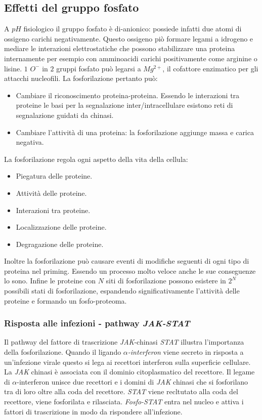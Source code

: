 	\subsection{Effetti del gruppo fosfato}
	A $pH$ fisiologico il gruppo fosfato \`e di-anionico: possiede infatti due atomi di ossigeno carichi negativamente. 
	Questo ossigeno pi\`o formare legami a idrogeno e mediare le interazioni elettrostatiche che possono stabilizzare una proteina internamente per esempio con amminoacidi carichi positivamente come arginine o lisine.
	$1$ \emph{$O^-$} in $2$ gruppi fosfato pu\`o legarsi a \emph{$Mg^{2+}$}, il cofattore enzimatico per gli attacchi nucleofili. 
	La fosforilazione pertanto pu\`o:
	\begin{itemize}
		\item Cambiare il riconoscimento proteina-proteina. 
			Essendo le interazioni tra proteine le basi per la segnalazione inter/intracellulare esistono reti di segnalazione guidati da chinasi.
		\item Cambiare l'attivit\`a di una proteina: la fosforilazione aggiunge massa e carica negativa.
	\end{itemize}
	La fosforilazione regola ogni aspetto della vita della cellula:
	\begin{multicols}{2}
		\begin{itemize}
			\item Piegatura delle proteine.
			\item Attivit\`a delle proteine.
			\item Interazioni tra proteine.
			\item Localizzazione delle proteine.
			\item Degragazione delle proteine.
		\end{itemize}
	\end{multicols}
	Inoltre la fosforilazione pu\`o causare eventi di modifiche seguenti di ogni tipo di proteina nel priming.
	Essendo un processo molto veloce anche le sue conseguenze lo sono.
	Infine le proteine con $N$ siti di fosforilazione possono esistere in $2^N$ possibili stati di fosforilazione, espandendo significativamente l'attivit\`a delle proteine e formando un fosfo-proteoma.

		\subsubsection{Risposta alle infezioni - pathway \emph{JAK-STAT}}
		Il pathway del fattore di trascrizione \emph{JAK}-chinasi \emph{STAT} illustra l'importanza della fosforilazione.
		Quando il ligando \emph{$\alpha$-interferon} viene secreto in risposta a un'infezione virale questo si lega ai recettori interferon sulla superficie cellulare.
		La \emph{JAK} chinasi \`e associata con il dominio citoplasmatico del recettore.
		Il legame di $\alpha$-interferon unisce due recettori e i domini di \emph{JAK} chinasi che si fosforilano tra di loro oltre alla coda del recettore.
		\emph{STAT} viene recltutato alla coda del recettore, viene fosforilata e rilasciata.
		\emph{Fosfo-STAT} entra nel nucleo e attiva i fattori di trascrizione in modo da rispondere all'infezione. 

